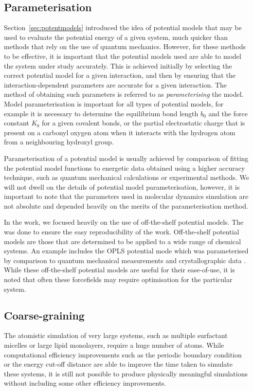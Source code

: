 \subsection{Parameterisation}
\label{sec:parameterisation}
Section~\ref{sec:potentmodels} introduced the idea of potential models that may be used to evaluate the potential energy of a given system, much quicker than methods that rely on the use of quantum mechanics.
However, for these methods to be effective, it is important that the potential models used are able to model the system under study accurately.
This is achieved initially by selecting the correct potential model for a given interaction, and then by ensuring that the interaction-dependent parameters are accurate for a given interaction.
The method of obtaining such parameters is referred to as \emph{parameterising} the model.
Model parameterisation is important for all types of potential models, for example it is necessary to determine the equilibrium bond length $b_0$ and the force constant $K_b$ for a given covalent bonds, or the partial electrostatic charge that is present on a carbonyl oxygen atom when it interacts with the hydrogen atom from a neighbouring hydroxyl group.

Parameterisation of a potential model is usually achieved by comparison of fitting the potential model functions to energetic data obtained using a higher accuracy technique, such as quantum mechanical calculations or experimental methods.
We will not dwell on the details of potential model parameterisation, however, it is important to note that the parameters used in molecular dynamics simulation are not absolute and depended heavily on the merits of the parameterisation method.

In the work, we focused heavily on the use of off-the-shelf potential models.
The was done to ensure the easy reproducibility of the work.
Off-the-shelf potential models are those that are determined to be applied to a wide range of chemical systems.
An example includes the OPLS potential mode which was parameterised by comparison to quantum mechanical measurements and crystallographic data \cite{jorgensen_opls_1988}.
While these off-the-shelf potential models are useful for their ease-of-use, it is noted that often these forcefields may require optimisation for the particular system.

\subsection{Coarse-graining}
\label{sec:coarsegraining}
The atomistic simulation of very large systems, such as multiple surfactant micelles or large lipid monolayers, require a huge number of atoms.
While computational efficiency improvements such as the periodic boundary condition or the energy cut-off distance are able to improve the time taken to simulate these systems, it is still not possible to produce physically meaningful simulations without including some other efficiency improvements.

